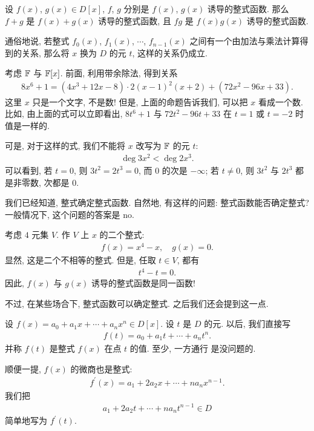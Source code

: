 \begin{proposition}
    设 $f(x)$, $g(x) \in D[x]$, $f$, $g$ 分别是 $f(x)$, $g(x)$ 诱导的整式函数. 那么 $f+g$ 是 $f(x)+g(x)$ 诱导的整式函数, 且 $fg$ 是 $f(x)g(x)$ 诱导的整式函数.

    通俗地说, 若整式 $f_0 (x)$, $f_1 (x)$, $\cdots$, $f_{n-1} (x)$ 之间有一个由加法与乘法计算得到的关系, 那么将 $x$ 换为 $D$ 的元 $t$, 这样的关系仍成立.
\end{proposition}

\begin{example}
    考虑 $\mathbb{F}$ 与 $\mathbb{F}[x]$. 前面, 利用带余除法, 得到关系
    \begin{align*}
        8x^6 + 1 = (4x^3 + 12x - 8) \cdot 2(x-1)^2 (x+2) + (72x^2 - 96x + 33).
    \end{align*}
    这里 $x$ 只是一个文字, 不是数! 但是, 上面的命题告诉我们, 可以把 $x$ 看成一个数. 比如, 由上面的式可以立即看出, $8t^6 + 1$ 与 $72t^2 - 96t + 33$ 在 $t = 1$ 或 $t = -2$ 时值是一样的.

    可是, 对于这样的式, 我们不能将 $x$ 改写为 $\mathbb{F}$ 的元 $t$:
    \begin{align*}
        \deg 3x^2 < \deg 2x^3.
    \end{align*}
    可以看到, 若 $t=0$, 则 $3t^2 = 2t^3 = 0$, 而 $0$ 的次是 $-\infty$; 若 $t \neq 0$, 则 $3t^2$ 与 $2t^3$ 都是非零数, 次都是 $0$.
\end{example}

\begin{remark}
    我们已经知道, 整式确定整式函数. 自然地, 有这样的问题: 整式函数能否确定整式? 一般情况下, 这个问题的答案是 no.

    考虑 $4$ 元集 $V$. 作 $V$ 上 $x$ 的二个整式:
    \begin{align*}
        f(x) = x^4 - x, \quad g(x) = 0.
    \end{align*}
    显然, 这是二个不相等的整式. 但是, 任取 $t \in V$, 都有
    \begin{align*}
        t^4 - t = 0.
    \end{align*}
    因此, $f(x)$ 与 $g(x)$ 诱导的整式函数是同一函数!

    不过, 在某些场合下, 整式函数可以确定整式. 之后我们还会提到这一点.
\end{remark}

\begin{remark}
    设 $f(x) = a_0 + a_1 x + \cdots + a_n x^n \in D[x]$. 设 $t$ 是 $D$ 的元. 以后, 我们直接写
    \begin{align*}
        f(t) = a_0 + a_1 t + \cdots + a_n t^n.
    \end{align*}
    并称 $f(t)$ 是整式 $f(x)$ 在点  $t$ 的值. 至少, 一方通行  是没问题的.

    顺便一提, $f(x)$ 的微商也是整式:
    \begin{align*}
        f^{\prime} (x) = a_1 + 2a_2 x + \cdots + na_n x^{n-1}.
    \end{align*}
    我们把
    \begin{align*}
        a_1 + 2a_2 t + \cdots + na_n t^{n-1} \in D
    \end{align*}
    简单地写为 $f^{\prime} (t)$.
\end{remark}

